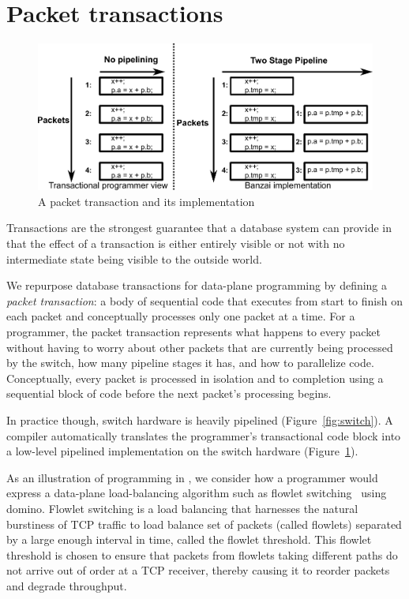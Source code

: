 \section{Packet transactions}
\begin{figure}
  \includegraphics[width=\columnwidth]{spec_vs_impl.pdf}
  \caption{A packet transaction and its implementation}
  \label{fig:trans}
\end{figure}

Transactions are the strongest guarantee that a database system can provide in
that the effect of a transaction is either entirely visible or not with no
intermediate state being visible to the outside world.

We repurpose database transactions for data-plane programming by defining a
\textit{packet transaction}: a body of sequential code that executes from start
to finish on each packet and conceptually processes only one packet at a time.
For a programmer, the packet transaction represents what happens to every
packet without having to worry about other packets that are currently being
processed by the switch, how many pipeline stages it has, and how to
parallelize code. Conceptually, every packet is processed in isolation and to
completion using a sequential block of code before the next packet's processing
begins.

In practice though, switch hardware is heavily pipelined
(Figure~\ref{fig:switch}).  A compiler automatically translates the
programmer's transactional code block into a low-level pipelined implementation
on the switch hardware (Figure~\ref{fig:trans}).

As an illustration of programming in \pktlanguage, we consider how a programmer
would express a data-plane load-balancing algorithm such as flowlet
switching~\cite{flowlet} using domino. Flowlet switching is a load balancing
that harnesses the natural burstiness of TCP traffic to load balance set of
packets (called flowlets) separated by a large enough interval in time, called
the flowlet threshold. This flowlet threshold is chosen to ensure that packets
from flowlets taking different paths do not arrive out of order at a TCP
receiver, thereby causing it to reorder packets and degrade throughput.

